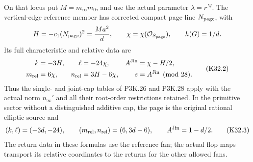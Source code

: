 \begin{theorem}
On that locus put $M=m_\infty m_0$, and use the actual
parameter $\lambda=r^M$. The vertical-edge reference member
has corrected compact page line $N_{\rm page}$, with
\[
 H=-c_1(N_{\rm page})^2=\frac{Ma^2}{d},\qquad
 \chi=\chi(\mathcal O_{S_{\rm page}}),\qquad h(G)=1/d.
\]
Its full characteristic and relative data are
\[
 \begin{aligned}
 k&=-3H,&\ell&=-24\chi,& A^{\rm Jin}&=\chi-H/2,\\
 m_{\rm rel}&=6\chi,&n_{\rm rel}&=3H-6\chi,
 &s&=A^{\rm Jin}\pmod {28}.                           
 \end{aligned}\tag{K32.2}
\]
Thus the single- and joint-cap tables of P3K.26 and P3K.28
apply with the actual norm $n_\infty'$ and all their root-order
restrictions retained. In the primitive sector without a
distinguished additive cap, the page is the original rational
elliptic source and
\[
 (k,\ell)=(-3d,-24),\qquad
 (m_{\rm rel},n_{\rm rel})=(6,3d-6),\qquad
 A^{\rm Jin}=1-d/2.                                   \tag{K32.3}
\]
The return data in these formulas use the reference fan;
the actual flop maps transport its relative coordinates to
the returns for the other allowed fans.
\end{theorem}

